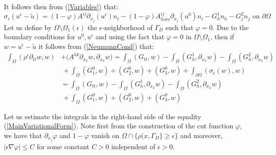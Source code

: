 It follows then from (\ref{Variables}) that:
\begin{equation}
    \label{NeumannCond}
    \sigma_{\epsilon} (u^{\epsilon}-\tilde{u}) = (1-\varphi) A^{ij} \partial_{x_j}(u^{\epsilon}) n_i - (1-\varphi) A^{ij}_{hom} \partial_{x_j}(u^0)n_i - G_h^1 n_h - G_j^2 n_j \text{ on } \partial \Omega
\end{equation}
Let us define by $\Omega \setminus \Omega_1(\epsilon)$ the $\epsilon$-neighborhood of $\Gamma_D$ such that $\varphi = 0$. Due to the boundary conditions for $u^0, u^{\epsilon}$ and using the fact that $\varphi = 0$ in $\Omega \setminus \Omega_1$, then if $w = u^{\epsilon}-\tilde{u}$ it follows from (\ref{NeumannCond}) that:
\begin{equation}
    \label{MainVariationalForm}
    \begin{array}{cc}
        \int_{\Omega} (\rho^{\epsilon} \partial_{tt}w, w) & + \big( A^{hk} \partial_{x_k} w, \partial_{x_h}w \big) = \int_{\Omega} (G_{tt}, w) - \int_{\Omega} (G_h^1,\partial_{x_h} w) - \int_{\Omega} ( G_h^2,\partial_{x_h} w) \\
        & \, + \int_{\Omega} (G_1^0, w) + (G_2^0, w) + (G_3^0, w) + \int_{\partial \Omega} (\sigma_{\epsilon}(w), w) \\
        & = \int_{\Omega} (G_{tt},w) - \int_{\Omega} (G_h^1, \partial_{x_h}w) - \int_{\Omega} (G_h^2, \partial_{x_h}w) \\
        & \, + \int_{\Omega} (G_1^0,w) + (G_2^0,w) + (G_3^0,w)
    \end{array}
\end{equation}

Let us estimate the integrals in the right-hand side of the equality (\ref{MainVariationalForm}).
Note first from the construction of the cut function $\varphi$, we have that $\partial_{x_j} \varphi$ and $1-\varphi$ vanish on $\Omega \cap \{ \rho(x, \Gamma_D \} \geq \epsilon \}$ and moreover, $\vert \epsilon \nabla \varphi \vert \leq C$ for some constant $C > 0$ independent of $\epsilon > 0$.

